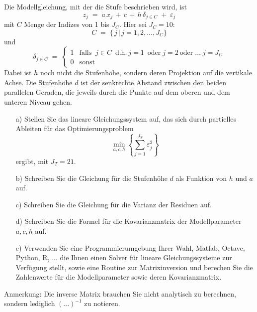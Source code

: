 \vspace{2mm}

Die Modellgleichung, mit der die Stufe beschrieben wird, ist
$$
z_j \; = \; a \, x_j \, + \, c \, + \, h \, \delta_{j \in C} \; + \; \varepsilon_j
$$
mit $C$ Menge der Indizes von 1 bis $J_C$. Hier sei $J_C = 10$:
$$
C \; = \; \{\, j \, | \, j = 1, 2, \dots, J_C \}
$$
und
$$
\delta_{j \in C} \; = \; \left\{
\begin{array}{ll}
1 & \mathrm{falls} \; \;  j \in C \; \mathrm{~d.h.~} j = 1 \; \mathrm{~oder} \; j = 2
\mathrm{~oder} \; \dots \; j = J_C\\
0 & \mathrm{sonst}
\end{array} \right.
$$
Dabei ist $h$ noch nicht die Stufenhöhe, sondern deren Projektion auf die vertikale Achse.
Die Stufenhöhe $d$ ist der senkrechte Abstand zwischen den beiden parallelen Geraden, die jeweils durch die Punkte auf dem oberen und dem unteren Niveau gehen.

\begin{itemize}
	\item[a)] Stellen Sie das lineare Gleichungssystem auf, das sich durch partielles Ableiten
	für das Optimierungsproblem
	$$
	\min\limits_{a,c,h} \left\{\sum_{j=1}^{J_T} \varepsilon_j^2\right\}
	$$
	ergibt, mit $J_T = 21$.
	\item[b)] Schreiben Sie die Gleichung für die Stufenhöhe $d$ als Funktion von $h$ und $a$ auf.
	\item[c)] Schreiben Sie die Gleichung für die Varianz der Residuen auf.
	\item[d)] Schreiben Sie die Formel für die Kovarianzmatrix der Modellparameter
	$a, c, h$ auf.
	\item[e)] Verwenden Sie eine Programmierumgebung Ihrer Wahl, Matlab, Octave, Python, R, ...
	die Ihnen einen Solver für lineare Gleichungssysteme zur Verfügung stellt, sowie
	eine Routine zur Matrixinversion und berechen Sie die Zahlenwerte für die Modellparameter
	sowie deren Kovarianzmatrix.
\end{itemize}
Anmerkung: Die inverse Matrix brauchen Sie nicht analytisch zu berechnen, sondern
	lediglich $(...)^{-1}$ zu notieren.
